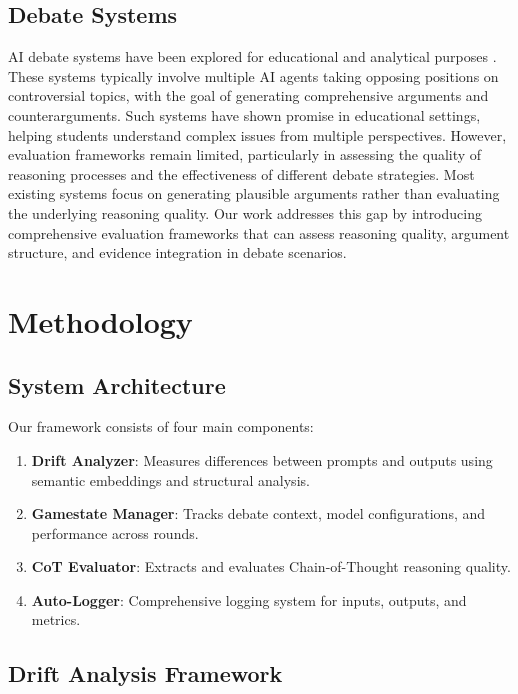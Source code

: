 \documentclass[11pt]{article}
\begin{document}
\subsection{Debate Systems}

AI debate systems have been explored for educational and analytical purposes \cite{slonim2021debater, rahman2025debate}. These systems typically involve multiple AI agents taking opposing positions on controversial topics, with the goal of generating comprehensive arguments and counterarguments. Such systems have shown promise in educational settings, helping students understand complex issues from multiple perspectives. However, evaluation frameworks remain limited, particularly in assessing the quality of reasoning processes and the effectiveness of different debate strategies. Most existing systems focus on generating plausible arguments rather than evaluating the underlying reasoning quality. Our work addresses this gap by introducing comprehensive evaluation frameworks that can assess reasoning quality, argument structure, and evidence integration in debate scenarios.

\section{Methodology}

\subsection{System Architecture}

Our framework consists of four main components:

\begin{enumerate}
    \item \textbf{Drift Analyzer}: Measures differences between prompts and outputs using semantic embeddings and structural analysis.
    \item \textbf{Gamestate Manager}: Tracks debate context, model configurations, and performance across rounds.
    \item \textbf{CoT Evaluator}: Extracts and evaluates Chain-of-Thought reasoning quality.
    \item \textbf{Auto-Logger}: Comprehensive logging system for inputs, outputs, and metrics.
\end{enumerate}

\subsection{Drift Analysis Framework}
\end{document}
